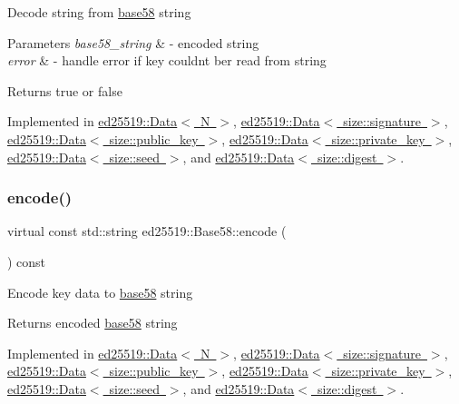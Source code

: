 Decode string from \mbox{\hyperlink{namespaceed25519_1_1base58}{base58}} string


\begin{DoxyParams}{Parameters}
{\em base58\+\_\+string} & -\/ encoded string \\
\hline
{\em error} & -\/ handle error if key couldn\textquotesingle{}t ber read from string \\
\hline
\end{DoxyParams}
\begin{DoxyReturn}{Returns}
true or false 
\end{DoxyReturn}


Implemented in \mbox{\hyperlink{classed25519_1_1_data_a281d932d3c3fe7fd40ce86ea7eff559b}{ed25519\+::\+Data$<$ N $>$}}, \mbox{\hyperlink{classed25519_1_1_data_a281d932d3c3fe7fd40ce86ea7eff559b}{ed25519\+::\+Data$<$ size\+::signature $>$}}, \mbox{\hyperlink{classed25519_1_1_data_a281d932d3c3fe7fd40ce86ea7eff559b}{ed25519\+::\+Data$<$ size\+::public\+\_\+key $>$}}, \mbox{\hyperlink{classed25519_1_1_data_a281d932d3c3fe7fd40ce86ea7eff559b}{ed25519\+::\+Data$<$ size\+::private\+\_\+key $>$}}, \mbox{\hyperlink{classed25519_1_1_data_a281d932d3c3fe7fd40ce86ea7eff559b}{ed25519\+::\+Data$<$ size\+::seed $>$}}, and \mbox{\hyperlink{classed25519_1_1_data_a281d932d3c3fe7fd40ce86ea7eff559b}{ed25519\+::\+Data$<$ size\+::digest $>$}}.

\mbox{\label{classed25519_1_1_base58_a1b52a018a5215e2dcf2aa388b0fe06bf}} 
\subsubsection{\texorpdfstring{encode()}{encode()}}
{\footnotesize\ttfamily virtual const std\+::string ed25519\+::\+Base58\+::encode (\begin{DoxyParamCaption}{ }\end{DoxyParamCaption}) const\hspace{0.3cm}{\ttfamily [pure virtual]}}

Encode key data to \mbox{\hyperlink{namespaceed25519_1_1base58}{base58}} string \begin{DoxyReturn}{Returns}
encoded \mbox{\hyperlink{namespaceed25519_1_1base58}{base58}} string 
\end{DoxyReturn}


Implemented in \mbox{\hyperlink{classed25519_1_1_data_a2dc2e23b950a10b168d7509a63ffca53}{ed25519\+::\+Data$<$ N $>$}}, \mbox{\hyperlink{classed25519_1_1_data_a2dc2e23b950a10b168d7509a63ffca53}{ed25519\+::\+Data$<$ size\+::signature $>$}}, \mbox{\hyperlink{classed25519_1_1_data_a2dc2e23b950a10b168d7509a63ffca53}{ed25519\+::\+Data$<$ size\+::public\+\_\+key $>$}}, \mbox{\hyperlink{classed25519_1_1_data_a2dc2e23b950a10b168d7509a63ffca53}{ed25519\+::\+Data$<$ size\+::private\+\_\+key $>$}}, \mbox{\hyperlink{classed25519_1_1_data_a2dc2e23b950a10b168d7509a63ffca53}{ed25519\+::\+Data$<$ size\+::seed $>$}}, and \mbox{\hyperlink{classed25519_1_1_data_a2dc2e23b950a10b168d7509a63ffca53}{ed25519\+::\+Data$<$ size\+::digest $>$}}.

